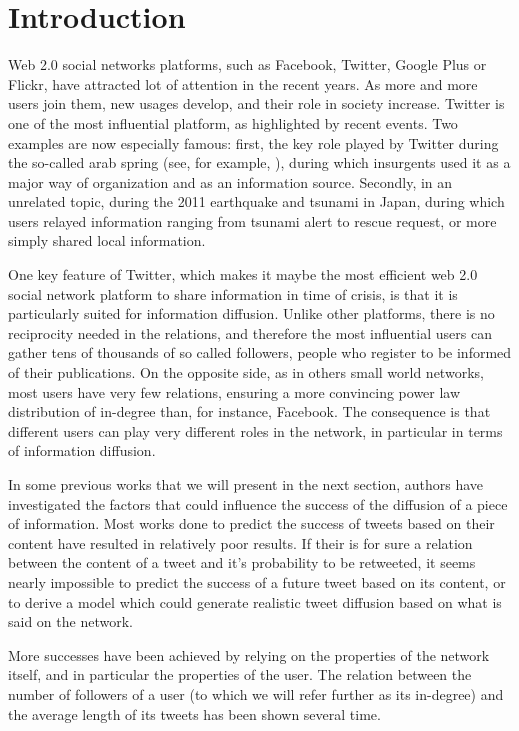\documentclass[conference]{IEEEtran}
\begin{document}
\section{Introduction}
Web 2.0 social networks platforms, such as Facebook, Twitter, Google Plus or Flickr, have attracted lot of attention in the recent years. As more and more users join them, new usages develop, and their role in society increase. Twitter is one of the most influential platform, as highlighted by recent events. Two examples are now especially famous: first, the key role played by Twitter during the so-called arab spring (see, for example, \cite{howard2011opening}), during which insurgents used it as a major way of organization and as an information source. Secondly, in an unrelated topic, during the 2011 earthquake and tsunami in Japan, during which users relayed information ranging from tsunami alert to rescue request, or more simply shared local information.

One key feature of Twitter, which makes it maybe the most efficient web 2.0 social network platform to share information in time of crisis, is that it is particularly suited for information diffusion. Unlike other platforms, there is no reciprocity needed in the relations, and therefore the most influential users can gather tens of thousands of so called followers, people who register to be informed of their publications. On the opposite side, as in others small world networks, most users have very few relations, ensuring a more convincing power law distribution of in-degree than, for instance, Facebook. The consequence is that different users can play very different roles in the network, in particular in terms of information diffusion.

In some previous works that we will present in the next section, authors have investigated the factors that could influence the success of the diffusion of a piece of information. Most works done to predict the success of tweets based on their content have resulted in relatively poor results. If their is for sure a relation between the content of a tweet and it's probability to be retweeted, it seems nearly impossible to predict the success of a future tweet based on its content, or to derive a model which could generate realistic tweet diffusion based on what is said on the network.

More successes have been achieved by relying on the properties of the network itself, and in particular the properties of the user. The relation between the number of followers of a user (to which we will refer further as its in-degree) and the average length of its tweets has been shown several time.
\end{document}
